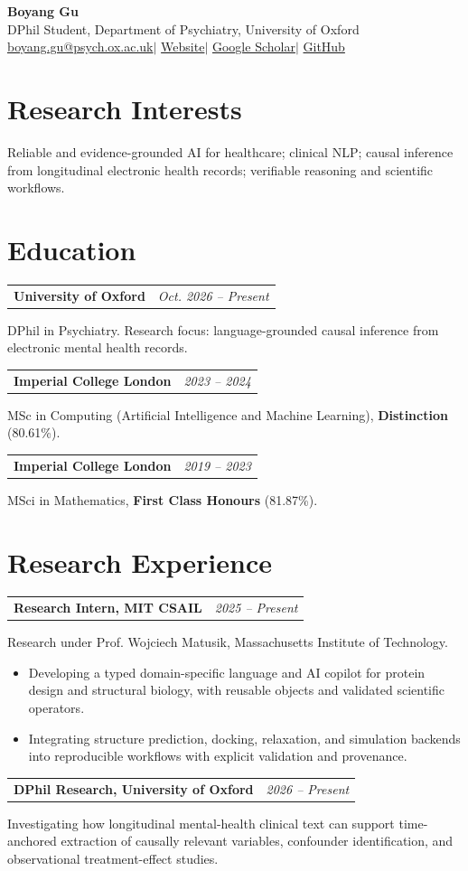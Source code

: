 \documentclass[a4paper,10pt]{article}
\makeatletter
\newcommand{\cventry}[3]{%
  \noindent\begin{tabular*}{\linewidth}{@{}l@{\extracolsep{\fill}}r@{}}
    \textbf{#1} & \textit{#2}\\
  \end{tabular*}\par\vspace{-3pt}%
  #3\par\vspace{2pt}%
}
\makeatother
\begin{document}
\begin{center}
  {\LARGE\bfseries Boyang Gu}\\[4pt]
  DPhil Student, Department of Psychiatry, University of Oxford\\[4pt]
  \href{mailto:boyang.gu@psych.ox.ac.uk}{boyang.gu@psych.ox.ac.uk}\enspace$\vert$\enspace
  \href{https://boyanggu1.github.io/}{Website}\enspace$\vert$\enspace
  \href{https://scholar.google.com/citations?user=3IXxQiQAAAAJ}{Google Scholar}\enspace$\vert$\enspace
  \href{https://github.com/BoyangGu1}{GitHub}
\end{center}

\section{Research Interests}
Reliable and evidence-grounded AI for healthcare; clinical NLP; causal inference from
longitudinal electronic health records; verifiable reasoning and scientific workflows.

\section{Education}
\cventry{University of Oxford}{Oct. 2026 -- Present}{%
  DPhil in Psychiatry. Research focus: language-grounded causal inference from electronic mental health records.}
\cventry{Imperial College London}{2023 -- 2024}{%
  MSc in Computing (Artificial Intelligence and Machine Learning), \textbf{Distinction} (80.61\%).}
\cventry{Imperial College London}{2019 -- 2023}{%
  MSci in Mathematics, \textbf{First Class Honours} (81.87\%).}

\section{Research Experience}
\cventry{Research Intern, MIT CSAIL}{2025 -- Present}{%
  Research under Prof. Wojciech Matusik, Massachusetts Institute of Technology.
  \begin{itemize}
    \item Developing a typed domain-specific language and AI copilot for protein design and structural biology, with reusable objects and validated scientific operators.
    \item Integrating structure prediction, docking, relaxation, and simulation backends into reproducible workflows with explicit validation and provenance.
  \end{itemize}
}
\cventry{DPhil Research, University of Oxford}{2026 -- Present}{%
  Investigating how longitudinal mental-health clinical text can support time-anchored extraction of causally relevant variables, confounder identification, and observational treatment-effect studies.}
\end{document}
